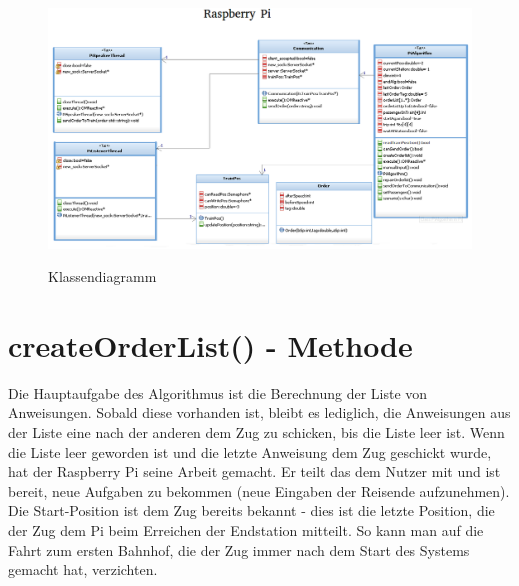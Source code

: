 \begin{figure}[H]	
\caption{Klassendiagramm}
\includegraphics[width=2\textwidth, width=470pt]{content/images/RaspberryPi.png}
\label{pic:init}
\end{figure}

\section{createOrderList() - Methode}
Die Hauptaufgabe des Algorithmus ist die Berechnung der Liste von Anweisungen. Sobald diese vorhanden ist, bleibt es lediglich, die Anweisungen aus der Liste eine nach der anderen dem Zug zu schicken, bis die Liste leer ist. Wenn die Liste leer geworden ist und die letzte Anweisung dem Zug geschickt wurde, hat der Raspberry Pi seine Arbeit gemacht. Er teilt das dem Nutzer mit und ist bereit, neue Aufgaben zu bekommen (neue Eingaben der Reisende aufzunehmen). Die Start-Position ist dem Zug bereits bekannt - dies ist die letzte Position, die der Zug dem Pi beim Erreichen der Endstation mitteilt. So kann man auf die Fahrt zum ersten Bahnhof, die der Zug immer nach dem Start des Systems gemacht hat, verzichten.\\

